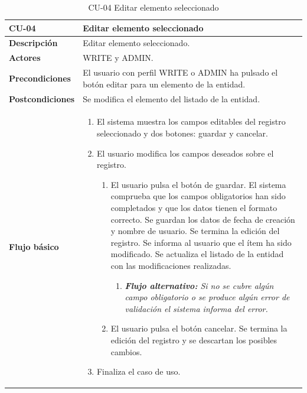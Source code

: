\begin{table} [H]
    \centering
    \setlength{\leftmargini}{0.4cm}
	\resizebox{15cm}{!} { %
    \begin{tabular}{| m{3cm} | m{12cm} |}   
    \hline
	  \textbf{CU-04} & \textbf{Editar elemento seleccionado} \\\hline
	  \textbf{Descripción} & Editar elemento seleccionado. \\\hline
	  \textbf{Actores} & WRITE y ADMIN. \\\hline
	  \textbf{Precondiciones} & El usuario con perfil WRITE o ADMIN ha pulsado el botón editar para un elemento de la entidad. \\\hline
	  \textbf{Postcondiciones} & Se modifica el elemento del listado de la entidad. \\\hline
	  \textbf{Flujo básico} & 
		\begin{enumerate}
	  	\item El sistema muestra los campos editables del registro seleccionado y dos botones: guardar y cancelar.
\item El usuario modifica los campos deseados sobre el registro. 
			\begin{enumerate}	
			   \item El usuario pulsa el botón de guardar. El sistema comprueba que los campos obligatorios han sido completados y que los datos tienen el formato correcto. Se guardan los datos de fecha de creación y nombre de usuario. Se termina la edición del registro. Se informa al usuario que el ítem ha sido modificado. Se actualiza el listado de la entidad con las modificaciones realizadas.
			   \begin{enumerate}	
			   \item  \textit{\textbf{Flujo alternativo:} Si no se cubre algún campo obligatorio o se produce algún error de validación el sistema informa del error.}
			   \end{enumerate}
			   \item El usuario pulsa el botón cancelar. Se termina la edición del registro y se descartan los posibles cambios.
			\end{enumerate}
	  \item Finaliza el caso de uso.
	  \end{enumerate} 	  	  
	  \\\hline
    \end{tabular}
    } %
    \caption{CU-04 Editar elemento seleccionado}
    \label{tab:cu-editar-elemento}
\end{table}


